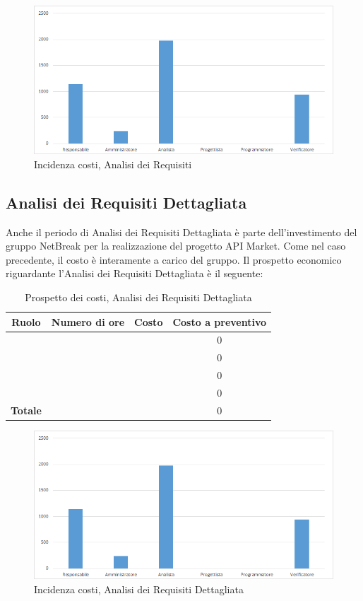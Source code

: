 \begin{figure}[H]
	\centering
	\includegraphics[scale=0.6]{img/8-1.png}
	\caption{Incidenza costi, Analisi dei Requisiti}
\end{figure}

\subsection{Analisi dei Requisiti Dettagliata}
Anche il periodo di Analisi dei Requisiti Dettagliata è parte dell'investimento del gruppo NetBreak per la realizzazione del progetto API Market. Come nel caso precedente, il costo è interamente a carico del gruppo. Il prospetto economico riguardante l'Analisi dei Requisiti Dettagliata è il seguente:


\begin{table}[H]
	\begin{center}
		\begin{tabular}{|c|c|c|c|}
			\hline
			\textbf{Ruolo}	& \textbf{Numero di ore} & \textbf{Costo} & \textbf{Costo a preventivo}\\
			\hline
			\Res	&	  &		&  0	\\
			\hline
			\Amm	&	  &		&  0	\\
			\hline
			\Ana	&	  &		&  0	\\
			\hline
			\Ver	&	  &		&  0	\\
			\hline
			\textbf{Totale}  &		&	 &  0	\\
			\hline
		\end{tabular}
	\end{center}
	\caption{Prospetto dei costi, Analisi dei Requisiti Dettagliata }
\end{table}

\begin{figure}[H]
	\centering
	\includegraphics[scale=0.6]{img/8-1.png}
	\caption{Incidenza costi, Analisi dei Requisiti Dettagliata}
\end{figure}

